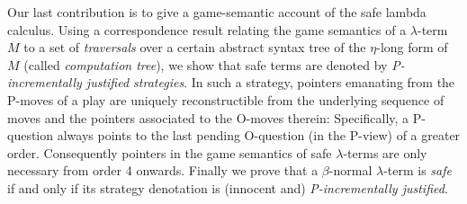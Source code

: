 Our last contribution is to give a game-semantic account of the safe
lambda calculus.
%
Using a correspondence result relating the game semantics of a
$\lambda$-term $M$ to a set of \emph{traversals} \cite{OngLics2006}
over a certain abstract syntax tree of the $\eta$-long form of $M$
(called \emph{computation tree}), we show that safe terms are
denoted by \emph{P-incrementally justified strategies}. In such a
strategy, pointers emanating from the P-moves of a play are uniquely
reconstructible from the underlying sequence of moves and the
pointers associated to the O-moves therein: Specifically, a
P-question always points to the last pending O-question (in the
P-view) of a greater order. Consequently pointers in the game
semantics of safe $\lambda$-terms are only necessary from order 4
onwards. Finally we prove that a $\beta$-normal $\lambda$-term is
\emph{safe} if and only if its strategy denotation is (innocent and)
\emph{P-incrementally justified}.



